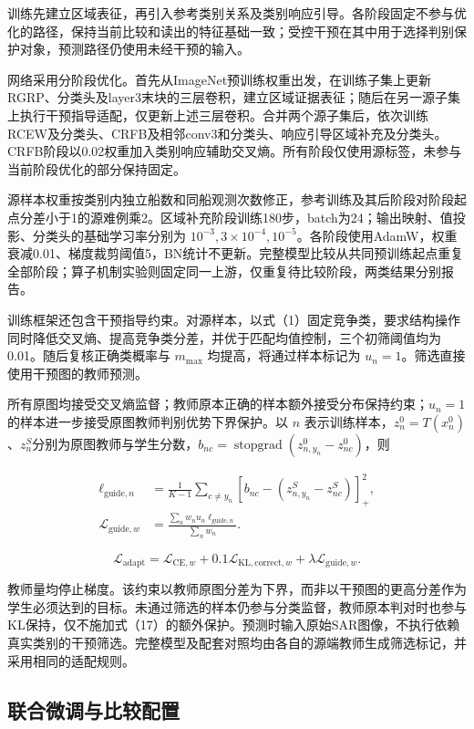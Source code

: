 \documentclass[journal,10pt,a4paper]{IEEEtran}
\begin{document}
训练先建立区域表征，再引入参考类别关系及类别响应引导。各阶段固定不参与优化的路径，保持当前比较和读出的特征基础一致；受控干预在其中用于选择判别保护对象，预测路径仍使用未经干预的输入。

网络采用分阶段优化。首先从ImageNet预训练权重出发，在训练子集上更新RGRP、分类头及layer3末块的三层卷积，建立区域证据表征；随后在另一源子集上执行干预指导适配，仅更新上述三层卷积。合并两个源子集后，依次训练RCEW及分类头、CRFB及相邻conv3和分类头、响应引导区域补充及分类头。CRFB阶段以0.02权重加入类别响应辅助交叉熵。所有阶段仅使用源标签，未参与当前阶段优化的部分保持固定。

源样本权重按类别内独立船数和同船观测次数修正，参考训练及其后阶段对阶段起点分差小于1的源难例乘2。区域补充阶段训练180步，batch为24；输出映射、值投影、分类头的基础学习率分别为 \(10^{-3},3\times10^{-4},10^{-5}\)。各阶段使用AdamW，权重衰减0.01、梯度裁剪阈值5，BN统计不更新。完整模型比较从共同预训练起点重复全部阶段；算子机制实验则固定同一上游，仅重复待比较阶段，两类结果分别报告。

训练框架还包含干预指导约束。对源样本，以式（1）固定竞争类，要求结构操作同时降低交叉熵、提高竞争类分差，并优于匹配均值控制，三个初筛阈值均为0.01。随后复核正确类概率与 \(m_{\max}\) 均提高，将通过样本标记为 \(u_n=1\)。筛选直接使用干预图的教师预测。

所有原图均接受交叉熵监督；教师原本正确的样本额外接受分布保持约束；\(u_n=1\)的样本进一步接受原图教师判别优势下界保护。以 \(n\) 表示训练样本，\(z_n^0=T(x_n^0)\)、\(z_n^S\)分别为原图教师与学生分数，\(b_{nc}=\operatorname{stopgrad}(z^0_{n,y_n}-z^0_{nc})\)，则

\[\begin{aligned}
\ell_{\mathrm{guide},n}
&=\frac{1}{K-1}\sum_{c\ne y_n}[b_{nc}-(z^S_{n,y_n}-z^S_{nc})]_+^2,\\
\mathcal L_{\mathrm{guide},w}
&=\frac{\sum_n w_nu_n\ell_{\mathrm{guide},n}}{\sum_n w_n}.
\end{aligned}\tag{17}\]

\[\mathcal L_{\mathrm{adapt}}=\mathcal L_{\mathrm{CE},w}+0.1\mathcal L_{\mathrm{KL,correct},w}+\lambda\mathcal L_{\mathrm{guide},w}.\tag{18}\]

教师量均停止梯度。该约束以教师原图分差为下界，而非以干预图的更高分差作为学生必须达到的目标。未通过筛选的样本仍参与分类监督，教师原本判对时也参与KL保持，仅不施加式（17）的额外保护。预测时输入原始SAR图像，不执行依赖真实类别的干预筛选。完整模型及配套对照均由各自的源端教师生成筛选标记，并采用相同的适配规则。

\subsection{联合微调与比较配置}\label{ux8054ux5408ux5faeux8c03ux4e0eux6bd4ux8f83ux914dux7f6e}
\end{document}
